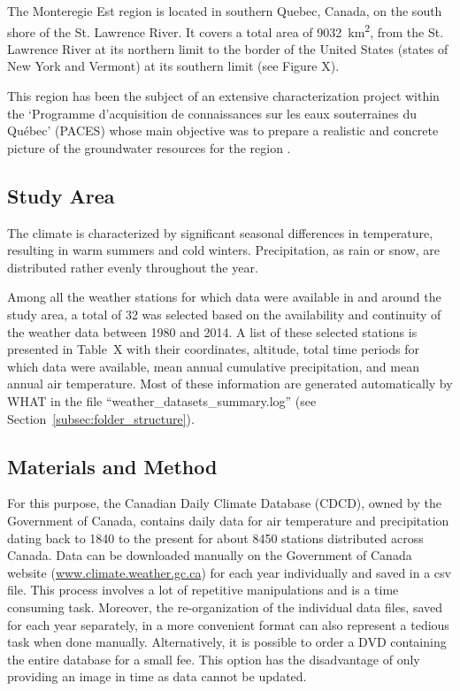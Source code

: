 \documentclass[TechnicalNoteMeteo.tex]{subfiles}
\begin{document}
The Monteregie Est region is located in southern Quebec, Canada, on the south shore of the St. Lawrence River. It covers a total area of \SI{9032}{km^2}, from the St. Lawrence River at its northern limit to the border of the United States (states of New York and Vermont) at its southern limit (see Figure X).

This region has been the subject of an extensive characterization project within the `Programme d'acquisition de connaissances sur les eaux souterraines du Québec' (PACES) whose main objective was to prepare a realistic and concrete picture of the groundwater resources for the region \citep{carrier_portrait_2013}.

\subsection{Study Area}

The climate is characterized by significant seasonal differences in temperature, resulting in warm summers and cold winters. Precipitation, as rain or snow, are distributed rather evenly throughout the year.

Among all the weather stations for which data were available in and around the study area, a total of 32 was selected based on the availability and continuity of the weather data between 1980 and 2014. A list of these selected stations is presented in Table~X with their coordinates, altitude, total time periods for which data were available, mean annual cumulative precipitation, and mean annual air temperature. Most of these information are generated automatically by WHAT in the file ``weather\_datasets\_summary.log'' (see Section~\ref{subsec:folder_structure}).

\subsection{Materials and Method}

For this purpose, the Canadian Daily Climate Database (CDCD), owned by the Government of Canada, contains daily data for air temperature and precipitation dating back to 1840 to the present for about 8450 stations distributed across Canada. Data can be downloaded manually on the Government of Canada website (\url{www.climate.weather.gc.ca}) for each year individually and saved in a csv file. This process involves a lot of repetitive manipulations and is a time consuming task. Moreover, the re-organization of the individual data files, saved for each year separately, in a more convenient format can also represent a tedious task when done manually. Alternatively, it is possible to order a DVD containing the entire database for a small fee. This option has the disadvantage of only providing an image in time as data cannot be updated.  
\end{document}
